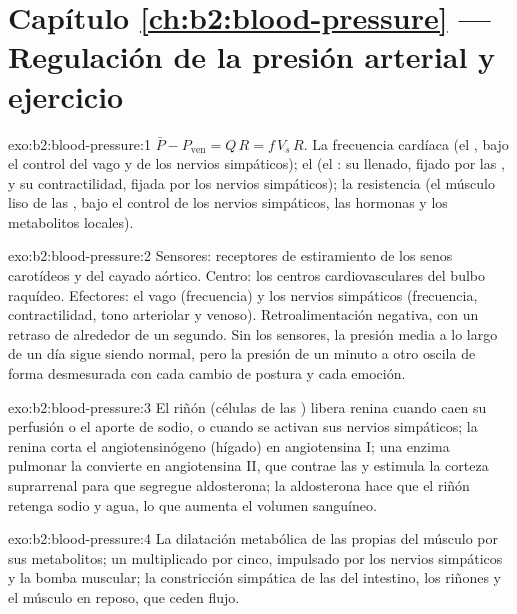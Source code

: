 \section*{Capítulo \ref{ch:b2:blood-pressure} --- Regulación de la presión arterial y ejercicio}

\begin{solution}{exo:b2:blood-pressure:1}
$\bar P - P_{\text{ven}} = Q\,R = f\,V_s\,R$. La frecuencia cardíaca (el
, bajo el control del vago y de los nervios
simpáticos); el  (el : su llenado, fijado por
las , y su contractilidad, fijada por los nervios simpáticos); la
resistencia (el músculo liso de las , bajo el control de los
nervios simpáticos, las hormonas y los metabolitos locales).
\end{solution}

\begin{solution}{exo:b2:blood-pressure:2}
Sensores: receptores de estiramiento de los senos carotídeos y del cayado
aórtico. Centro: los centros cardiovasculares del bulbo raquídeo.
Efectores: el vago (frecuencia) y los nervios simpáticos (frecuencia,
contractilidad, tono arteriolar y venoso). Retroalimentación negativa,
con un retraso de alrededor de un segundo. Sin los sensores, la presión
media a lo largo de un día sigue siendo normal, pero la presión de un
minuto a otro oscila de forma desmesurada con cada cambio de postura y
cada emoción.
\end{solution}

\begin{solution}{exo:b2:blood-pressure:3}
El riñón (células de las ) libera renina cuando caen su
perfusión o el aporte de sodio, o cuando se activan sus nervios
simpáticos; la renina corta el angiotensinógeno (hígado) en
angiotensina I; una enzima pulmonar la convierte en angiotensina II, que
contrae las  y estimula la corteza suprarrenal para que segregue
aldosterona; la aldosterona hace que el riñón retenga sodio y agua, lo que
aumenta el volumen sanguíneo.
\end{solution}

\begin{solution}{exo:b2:blood-pressure:4}
La dilatación metabólica de las propias  del músculo por sus
metabolitos; un  multiplicado por cinco, impulsado por los
nervios simpáticos y la bomba muscular; la constricción simpática de las
 del intestino, los riñones y el músculo en reposo, que ceden
flujo.
\end{solution}

